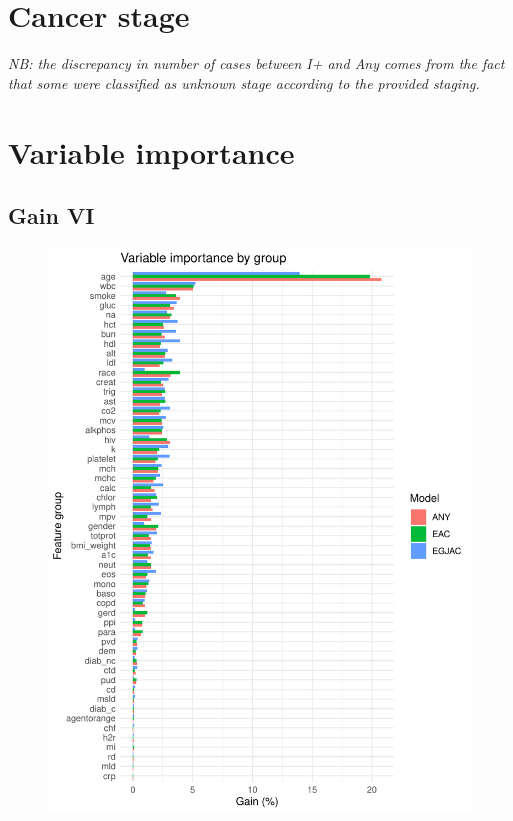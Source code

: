 \documentclass[english]{article}
\begin{document}
\newpage
\clearpage
\section{Cancer stage}

\textit{NB: the discrepancy in number of cases between I+ and Any comes from the fact that some were classified as unknown stage according to the provided staging. }











\newpage
\clearpage
\section{Variable importance}

\subsection{Gain VI}

\begin{figure}[ht]
\includegraphics[width=0.8\linewidth]{variable_importance/vi_group.pdf}
\end{figure}
\end{document}
